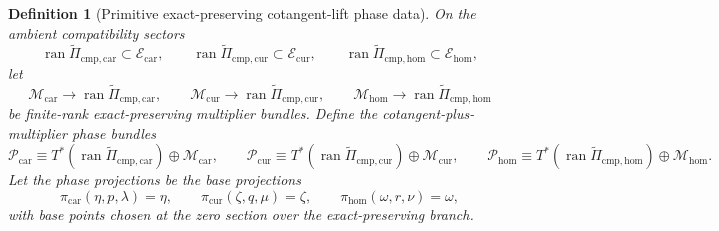 \documentclass[11pt]{article}
\newcommand{\TensorEqClass}{\mathscr E_{\mathrm{car}}}
\newcommand{\CurEqClass}{\mathscr E_{\mathrm{cur}}}
\newcommand{\HomEqClass}{\mathscr E_{\mathrm{hom}}}
\newcommand{\TensorEqCmpProj}{\widetilde\Pi_{\mathrm{cmp,car}}}
\newcommand{\CurEqCmpProj}{\widetilde\Pi_{\mathrm{cmp,cur}}}
\newcommand{\HomEqCmpProj}{\widetilde\Pi_{\mathrm{cmp,hom}}}
\newcommand{\TensorPhaseClass}{\mathscr P_{\mathrm{car}}}
\newcommand{\CurPhaseClass}{\mathscr P_{\mathrm{cur}}}
\newcommand{\HomPhaseClass}{\mathscr P_{\mathrm{hom}}}
\newcommand{\TensorPhaseProj}{\pi_{\mathrm{car}}}
\newcommand{\CurPhaseProj}{\pi_{\mathrm{cur}}}
\newcommand{\HomPhaseProj}{\pi_{\mathrm{hom}}}
\newtheorem{definition}{Definition}
\begin{document}
\begin{definition}[Primitive exact-preserving cotangent-lift phase data]
\label{def:primitive_cotangent_phase}
On the ambient compatibility sectors
\[
\operatorname{ran}\TensorEqCmpProj\subset\TensorEqClass,\qquad
\operatorname{ran}\CurEqCmpProj\subset\CurEqClass,\qquad
\operatorname{ran}\HomEqCmpProj\subset\HomEqClass,
\]
let
\[
\mathcal M_{\mathrm{car}}\to\operatorname{ran}\TensorEqCmpProj,\qquad
\mathcal M_{\mathrm{cur}}\to\operatorname{ran}\CurEqCmpProj,\qquad
\mathcal M_{\mathrm{hom}}\to\operatorname{ran}\HomEqCmpProj
\]
be finite-rank exact-preserving multiplier bundles. Define the cotangent-plus-multiplier phase bundles
\begin{equation}
\TensorPhaseClass
\equiv
T^*(\operatorname{ran}\TensorEqCmpProj)\oplus\mathcal M_{\mathrm{car}},
\qquad
\CurPhaseClass
\equiv
T^*(\operatorname{ran}\CurEqCmpProj)\oplus\mathcal M_{\mathrm{cur}},
\qquad
\HomPhaseClass
\equiv
T^*(\operatorname{ran}\HomEqCmpProj)\oplus\mathcal M_{\mathrm{hom}}.
\label{eq:cotangent_phase_bundles}
\end{equation}
Let the phase projections be the base projections
\begin{equation}
\TensorPhaseProj(\eta,p,\lambda)=\eta,\qquad
\CurPhaseProj(\zeta,q,\mu)=\zeta,\qquad
\HomPhaseProj(\omega,r,\nu)=\omega,
\label{eq:cotangent_phase_proj}
\end{equation}
with base points chosen at the zero section over the exact-preserving branch.


\end{definition}
\end{document}
